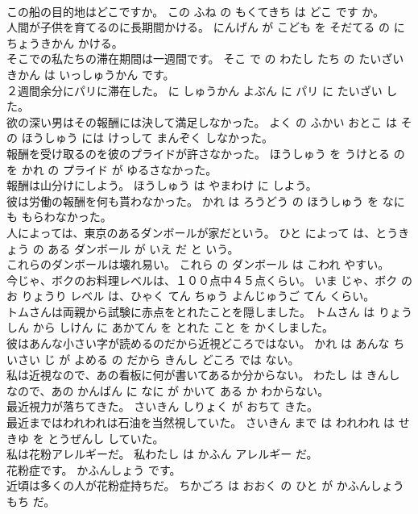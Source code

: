 \documentclass[8pt]{extreport}
\begin{document}
\begin{CJK}{UTF8}{min}
\\	この船の目的地はどこですか。	この ふね の もくてきち は どこ です か。	
\\	人間が子供を育てるのに長期間かける。	にんげん が こども を そだてる の に ちょうきかん かける。	
\\	そこでの私たちの滞在期間は一週間です。	そこ で の わたし たち の たいざい きかん は いっしゅうかん です。	
\\	２週間余分にパリに滞在した。	に しゅうかん よぶん に パリ に たいざい した。	
\\	欲の深い男はその報酬には決して満足しなかった。	よく の ふかい おとこ は その ほうしゅう には けっして まんぞく しなかった。	
\\	報酬を受け取るのを彼のプライドが許さなかった。	ほうしゅう を うけとる の を かれ の プライド が ゆるさなかった。	
\\	報酬は山分けにしよう。	ほうしゅう は やまわけ に しよう。	
\\	彼は労働の報酬を何も貰わなかった。	かれ は ろうどう の ほうしゅう を なに も もらわなかった。	
\\	人によっては、東京のあるダンボールが家だという。	ひと によって は、とうきょう の ある ダンボール が いえ だ と いう。	
\\	これらのダンボールは壊れ易い。	これら の ダンボール は こわれ やすい。	
\\	今じゃ、ボクのお料理レベルは、１００点中４５点くらい。	いま じゃ、ボク の お りょうり レベル は、ひゃく てん ちゅう よんじゅうご てん くらい。	
\\	トムさんは両親から試験に赤点をとれたことを隠しました。	トムさん は りょうしん から しけん に あかてん を とれた こと を かくしました。	
\\	彼はあんな小さい字が読めるのだから近視どころではない。	かれ は あんな ちいさい じ が よめる の だから きんし どころ では ない。	
\\	私は近視なので、あの看板に何が書いてあるか分からない。	わたし は きんし なので、あの かんばん に なに が かいて ある か わからない。	
\\	最近視力が落ちてきた。	さいきん しりょく が おちて きた。	
\\	最近まではわれわれは石油を当然視していた。	さいきん まで は われわれ は せきゆ を とうぜんし していた。	
\\	私は花粉アレルギーだ。	私わたし は かふん アレルギー だ。	
\\	花粉症です。	かふんしょう です。	
\\	近頃は多くの人が花粉症持ちだ。	ちかごろ は おおく の ひと が かふんしょう もち だ。	

\end{CJK}
\end{document}
